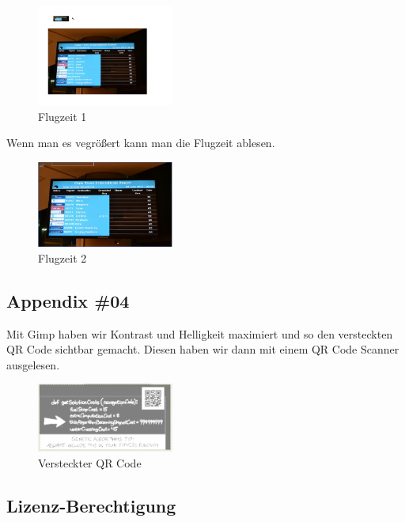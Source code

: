 \documentclass[12pt,a4paper,titlepage,oneside]{scrartcl}
\begin{document}
\begin{figure}[h!]
  \centering
    \includegraphics[width=0.4\textwidth]{./imgs/Forensik/versteckte_flugzeit1.png}
  \caption{Flugzeit 1}
  \label{fig:flugzeit1}
\end{figure}

Wenn man es vegrößert kann man die Flugzeit ablesen.

\begin{figure}[h!]
  \centering
    \includegraphics[width=0.4\textwidth]{./imgs/Forensik/versteckte_flugzeit.png}
  \caption{Flugzeit 2}
  \label{fig:flugzeit2}
\end{figure}

\pagebreak
\subsection{Appendix \#04}
Mit Gimp haben wir Kontrast und Helligkeit maximiert und so den versteckten QR Code sichtbar gemacht.
Diesen haben wir dann mit einem QR Code Scanner ausgelesen.


\begin{figure}[h!]
  \centering
    \includegraphics[width=0.4\textwidth]{./imgs/Forensik/hidden_qr.png}
  \caption{Versteckter QR Code}
  \label{fig:allvoipcalls}
\end{figure}

\pagebreak
\subsection{Lizenz-Berechtigung}
\end{document}
